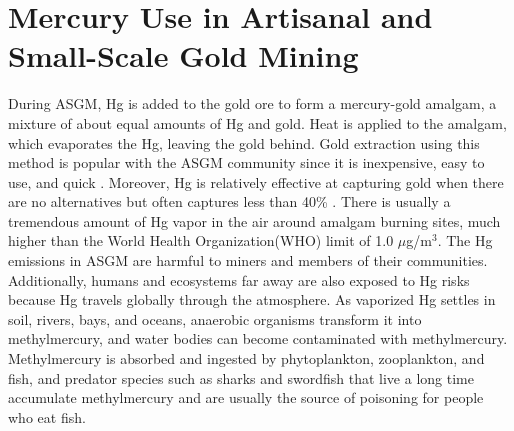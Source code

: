 \section{Mercury Use in Artisanal and Small-Scale Gold Mining}

\begin{flushleft} 
During ASGM, Hg is added to the gold ore to form a mercury-gold amalgam, a mixture of about equal amounts of Hg and gold\cite{united_nations_environment_programme_reducing_2012}. Heat is applied to the amalgam, which evaporates the Hg, leaving the gold behind. Gold extraction using this method is popular with the ASGM community since it is inexpensive, easy to use, and quick \cite{united_nations_environment_programme_reducing_2012}. Moreover, Hg is relatively effective at capturing gold when there are no alternatives but often captures less than 40\% \cite{united_nations_environment_programme_developing_2015}. There is usually a tremendous amount of Hg vapor in the air around amalgam burning sites, much higher than the World Health Organization(WHO) limit of 1.0 $\mu$g/m$^{3}$\cite{gibb_mercury_2014}. The Hg emissions in ASGM are harmful to miners and members of their communities.
Additionally, humans and ecosystems far away are also exposed to Hg risks because Hg travels globally through the atmosphere. As vaporized Hg settles in soil, rivers, bays, and oceans, anaerobic organisms transform it into methylmercury, and water bodies can become contaminated with methylmercury\cite{united_nations_environment_programme_technical_2019}. Methylmercury is absorbed and ingested by phytoplankton, zooplankton, and fish, and predator species such as sharks and swordfish that live a long time accumulate methylmercury and are usually the source of poisoning for people who eat fish\cite{gibb_mercury_2014}. 
\end{flushleft}


